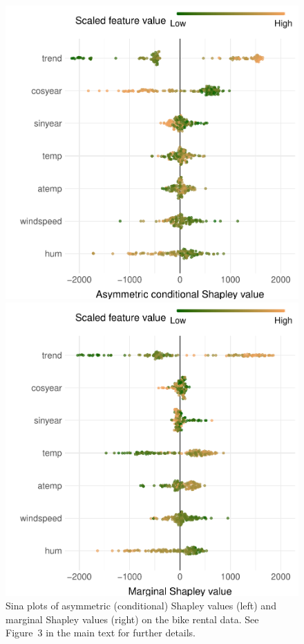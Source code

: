 \documentclass{article}
\begin{document}
\begin{figure}[t]
	\centering
	\begin{minipage}{.49\linewidth}
	\includegraphics[width=\textwidth]{figures/sina_plot_asymmetric.pdf}
	\end{minipage}
	\begin{minipage}{.49\linewidth}
	\includegraphics[width=\textwidth]{figures/sina_plot_marginal.pdf}
	\end{minipage}
	\caption{Sina plots of asymmetric (conditional) Shapley values (left) and marginal Shapley values (right) on the bike rental data. See Figure~3 in the main text for further details.}
	\label{fig:sinaplots}
\end{figure}
\end{document}
